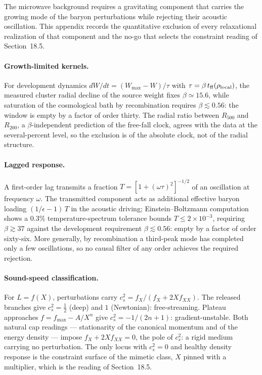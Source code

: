 \documentclass[11pt]{article}
\begin{document}
The microwave background requires a gravitating component that carries the growing mode of the baryon perturbations while rejecting their acoustic oscillation. This appendix records the quantitative exclusion of every relaxational realization of that component and the no-go that selects the constraint reading of Section~18.5.

\paragraph{Growth-limited kernels.} For development dynamics $dW/dt=(W_{\max}-W)/\tau$ with $\tau=\beta\,t_{\rm ff}(\rho_{\rm local})$, the measured cluster radial decline of the source weight fixes $\beta\simeq15.6$, while saturation of the cosmological bath by recombination requires $\beta\lesssim0.56$: the window is empty by a factor of order thirty. The radial ratio between $R_{500}$ and $R_{200}$, a $\beta$-independent prediction of the free-fall clock, agrees with the data at the several-percent level, so the exclusion is of the absolute clock, not of the radial structure.

\paragraph{Lagged response.} A first-order lag transmits a fraction $T=[1+(\omega\tau)^2]^{-1/2}$ of an oscillation at frequency $\omega$. The transmitted component acts as additional effective baryon loading $(1/\epsilon-1)\,T$ in the acoustic driving; Einstein--Boltzmann computation shows a $0.3\%$ temperature-spectrum tolerance bounds $T\le2\times10^{-3}$, requiring $\beta\gtrsim37$ against the development requirement $\beta\lesssim0.56$: empty by a factor of order sixty-six. More generally, by recombination a third-peak mode has completed only a few oscillations, so no causal filter of any order achieves the required rejection.

\paragraph{Sound-speed classification.} For $L=f(X)$, perturbations carry $c_s^2=f_X/(f_X+2Xf_{XX})$. The released branches give $c_s^2=\tfrac12$ (deep) and $1$ (Newtonian): free-streaming. Plateau approaches $f=f_{\max}-A/X^n$ give $c_s^2=-1/(2n{+}1)$: gradient-unstable. Both natural cap readings --- stationarity of the canonical momentum and of the energy density --- impose $f_X+2Xf_{XX}=0$, the pole of $c_s^2$: a rigid medium carrying no perturbation. The only locus with $c_s^2=0$ and healthy density response is the constraint surface of the mimetic class, $X$ pinned with a multiplier, which is the reading of Section~18.5.
\end{document}

